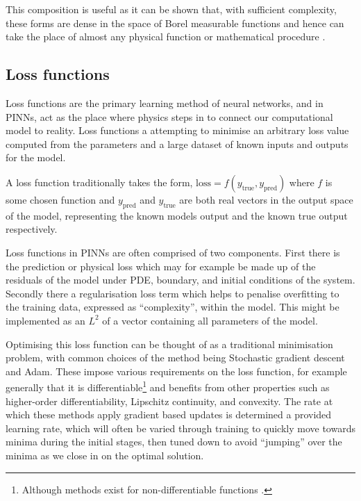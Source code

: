This composition is useful as it can be shown that, with sufficient complexity, these forms are dense in the space of Borel measurable functions and hence can take the place of almost any physical function or mathematical procedure \cite{hornikMultilayerFeedforwardNetworks1989}.

\subsection{Loss functions}
\label{sec:intro-lf}

Loss functions are the primary learning method of neural networks, and in PINNs, act as the place where physics steps in to connect our computational model to reality.
Loss functions a attempting to minimise an arbitrary loss value computed from the parameters and a large dataset of known inputs and outputs for the model.

A loss function traditionally takes the form, $\mathrm{loss} = f(y_{\text{true}}, y_{\text{pred}})$ where $f$ is some chosen function and $y_{\text{pred}}$ and $y_{\text{true}}$ are both real vectors in the output space of the model, representing the known models output and the known true output respectively.

Loss functions in PINNs are often comprised of two components. First there is the prediction or physical loss which may for example be made up of the residuals of the model under PDE, boundary, and initial conditions of the system. Secondly there a regularisation loss term which helps to penalise overfitting to the training data, expressed as \enquote{complexity}, within the model. This might be implemented as an $L^2$  of a vector containing all parameters of the model.

Optimising this loss function can be thought of as a traditional minimisation problem, with common choices of the method being Stochastic gradient descent and Adam\cite{kingmaAdamMethodStochastic2017}. These impose various requirements on the loss function, for example generally that it is differentiable\footnote{Although methods exist for non-differentiable functions \cite{daubechiesIterativeThresholdingAlgorithm2003}.} and benefits from other properties such as higher-order differentiability, Lipschitz continuity, and convexity\cite{sraOptimizationMachineLearning2012}. The rate at which these methods apply gradient based updates is determined a provided learning rate, which will often be varied through training to quickly move towards minima during the initial stages, then tuned down to avoid \enquote{jumping} over the minima as we close in on the optimal solution.

